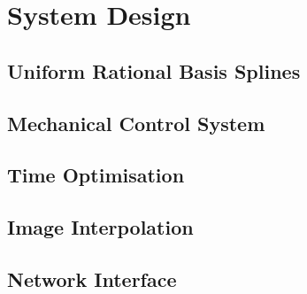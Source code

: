 \chapter{System Design}


\section{Uniform Rational Basis Splines}
\label{sec:design-urbs}
	
	
	

\section{Mechanical Control System}
\label{sec:design-control}
	

\section{Time Optimisation}
\label{sec:design-optimisation}
	
	
	
	
	


\section{Image Interpolation}
\label{sec:design-interpolation}
		

\section{Network Interface}
\label{sec:network}
